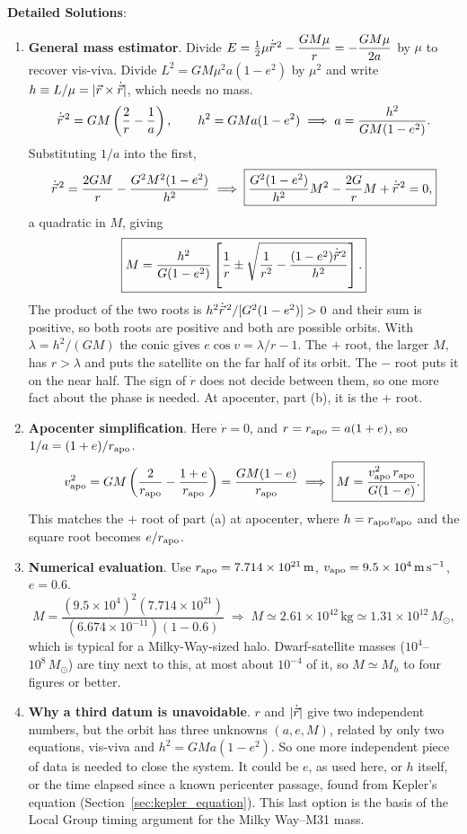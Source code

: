 \textbf{Detailed Solutions}:
\begin{enumerate}[label=(\alph*)]
	\item \textbf{General mass estimator}. Divide $E=\frac12\mu\dot{\vec r}^{\,2}-\dfrac{GM\mu}{r}=-\dfrac{GM\mu}{2a}$ by $\mu$ to recover vis-viva. Divide $L^2=GM\mu^2a(1-e^2)$ by $\mu^2$ and write $h\equiv L/\mu=|\vec r\times\dot{\vec r}|$, which needs no mass.
	\[
	\dot{\vec r}^{\,2}=GM\left(\frac2r-\frac1a\right),\qquad h^2=GMa(1-e^2)\;\Longrightarrow\;a=\frac{h^2}{GM(1-e^2)}.
	\]
	Substituting $1/a$ into the first,
	\[
	\dot{\vec r}^{\,2}=\frac{2GM}{r}-\frac{G^2M^2(1-e^2)}{h^2}
	\;\Longrightarrow\;
	\boxed{\frac{G^2(1-e^2)}{h^2}M^2-\frac{2G}{r}M+\dot{\vec r}^{\,2}=0,}
	\]
	a quadratic in $M$, giving
	\[
	\boxed{M=\frac{h^2}{G(1-e^2)}\left[\frac1r\pm\sqrt{\frac{1}{r^2}-\frac{(1-e^2)\dot{\vec r}^{\,2}}{h^2}}\right].}
	\]
	The product of the two roots is $h^2\dot{\vec r}^{\,2}/[G^2(1-e^2)]>0$ and their sum is positive, so both roots are positive and both are possible orbits. With $\lambda=h^2/(GM)$ the conic gives $e\cos v=\lambda/r-1$. The $+$ root, the larger $M$, has $r>\lambda$ and puts the satellite on the far half of its orbit. The $-$ root puts it on the near half. The sign of $\dot r$ does not decide between them, so one more fact about the phase is needed. At apocenter, part (b), it is the $+$ root.
	
	\item \textbf{Apocenter simplification}. Here $\dot r=0$, and $r=r_{\rm apo}=a(1+e)$, so $1/a=(1+e)/r_{\rm apo}$.
	\[
	v_{\rm apo}^2=GM\left(\frac{2}{r_{\rm apo}}-\frac{1+e}{r_{\rm apo}}\right)=\frac{GM(1-e)}{r_{\rm apo}}
	\;\Longrightarrow\;
	\boxed{M=\frac{v_{\rm apo}^2\,r_{\rm apo}}{G(1-e)}.}
	\]
	This matches the $+$ root of part (a) at apocenter, where $h=r_{\rm apo}v_{\rm apo}$ and the square root becomes $e/r_{\rm apo}$.
	
	\item \textbf{Numerical evaluation}. Use $r_{\rm apo}=7.714\times10^{21}\,\mathrm m$, $v_{\rm apo}=9.5\times10^4\,\mathrm{m\,s^{-1}}$, $e=0.6$.
	\[
	M=\frac{(9.5\times10^4)^2(7.714\times10^{21})}{(6.674\times10^{-11})(1-0.6)}
	\;\Longrightarrow\;
	\boxed{M\simeq2.61\times10^{42}\,\mathrm{kg}\simeq1.31\times10^{12}\,M_\odot,}
	\]
	which is typical for a Milky-Way-sized halo. Dwarf-satellite masses ($10^4$--$10^8\,M_\odot$) are tiny next to this, at most about $10^{-4}$ of it, so $M\simeq M_h$ to four figures or better.
	
	\item \textbf{Why a third datum is unavoidable}. $r$ and $|\dot{\vec r}|$ give two independent numbers, but the orbit has three unknowns $(a,e,M)$, related by only two equations, vis-viva and $h^2=GMa(1-e^2)$. So one more independent piece of data is needed to close the system. It could be $e$, as used here, or $h$ itself, or the time elapsed since a known pericenter passage, found from Kepler's equation (Section~\ref{sec:kepler_equation}). This last option is the basis of the Local Group timing argument for the Milky Way--M31 mass.
	

\end{enumerate}
